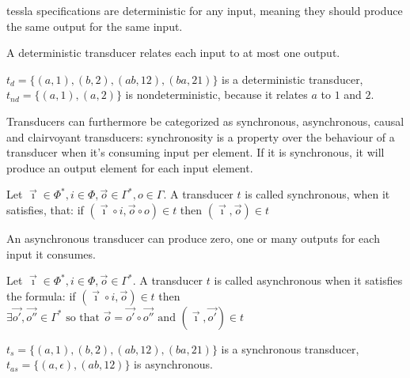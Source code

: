 \gls{tessla} specifications are deterministic for any input, meaning they should produce the same output for the same input.

\begin{definition}[name = Deterministic Transducer]\label{def:deterministic_transducer}
  A deterministic transducer relates each input to at most one output.
\end{definition}

\begin{exmp}[name = Deterministic and Nondeterministic Transducers]
  \(t_d = \{(a,1),(b,2),(ab,12),(ba,21)\}\) is a deterministic transducer, \(t_{nd} = \{(a,1),(a,2)\}\) is nondeterministic, because it relates \(a\) to \(1\) and \(2\).
\end{exmp}

Transducers can furthermore be categorized as synchronous, asynchronous, causal and clairvoyant transducers:
synchronosity is a property over the behaviour of a transducer when it's consuming input per element.
If it is synchronous, it will produce an output element for each input element.

\begin{definition}[name = Synchronous Transducer]\label{def:synchronous_transducer}
Let \(\vec{\imath} \in \Phi^*, i \in \Phi, \vec{o} \in \Gamma^*, o \in \Gamma\).
  A transducer \(t\) is called synchronous, when it satisfies, that:
  if \( (\vec{\imath}\circ i,\vec{o}\circ o) \in t\)
  then \( (\vec{\imath}, \vec{o}) \in t \)
\end{definition}

An asynchronous transducer can produce zero, one or many outputs for each input it consumes.

\begin{definition}[name = Asynchronous Transducer]\label{def:asynchronous_transducer}
  Let \(\vec{\imath}\in \Phi^*, i \in \Phi,\vec{o} \in \Gamma^*\).
  A transducer \(t\) is called asynchronous when it satisfies the formula:
  if \((\vec{\imath}\circ i, \vec{o}) \in t \)
  then \(\exists \vec{o'},\vec{o''} \in \Gamma^*\text{ so that } \vec{o} = \vec{o'}\circ\vec{o''} \text{ and } (\vec{\imath},\vec{o'}) \in t \)
\end{definition}

\begin{exmp}[name = Synchronous and Asynchronous Transducers]
  \(t_s = \{(a,1),(b,2),(ab,12),(ba,21)\}\) is a synchronous transducer, \(t_{as} = \{(a,\epsilon),(ab,12)\}\) is asynchronous.
\end{exmp}

